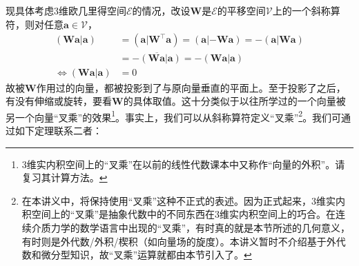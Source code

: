 \documentclass[../main.tex]{subfiles}
\begin{document}
现具体考虑3维欧几里得空间$\mathcal{E}$的情况，改设$\mathbf{W}$是$\mathcal{E}$的平移空间$\mathcal{V}$上的一个斜称算符，则对任意$\mathbf{a}\in\mathcal{V}$，
\[\begin{aligned}\left(\mathbf{Wa}|\mathbf{a}\right)                & =\left(\mathbf{a}|\mathbf{W}^\intercal\mathbf{a}\right)=\left(\mathbf{a}|-\mathbf{Wa}\right)=-\left(\mathbf{a}|\mathbf{Wa}\right) \\
                                                                  & =\overline{-\left(\mathbf{Wa}|\mathbf{a}\right)}=              -\left(\mathbf{Wa}|\mathbf{a}\right)                               \\
               \Leftrightarrow\left(\mathbf{Wa}|\mathbf{a}\right) & =0
    \end{aligned}\]
故被$\mathbf{W}$作用过的向量，都被投影到了与原向量垂直的平面上。至于投影了之后，有没有伸缩或旋转，要看$\mathbf{W}$的具体取值。这十分类似于以往所学过的一个向量被另一个向量“叉乘”的效果\footnote{3维实内积空间上的“叉乘”在以前的线性代数课本中又称作“向量的外积”\cite[\S3.2]{周胜林2012线性代数}。请复习其计算方法。}。事实上，我们可以从斜称算符定义“叉乘”\footnote{在本讲义中，将保持使用“叉乘”这种不正式的表述。因为正式起来，3维实内积空间上的“叉乘”是抽象代数中的不同东西在3维实内积空间上的巧合。在连续介质力学的数学语言中出现的“叉乘”，有时真的就是本节所述的几何意义，有时则是外代数/外积/楔积（如向量场的旋度）。本讲义暂时不介绍基于外代数和微分型知识，故“叉乘”运算就都由本节引入了。}。我们可通过如下定理联系二者：
\end{document}
